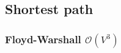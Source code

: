 \documentclass{article}
\begin{document}
\subsection{Shortest path}

\begin{comment}
\subsubsection{BFS $\mathcal{O}(V + E)$}

\begin{lstlisting}
int n, dist[MAXN];
vector<int> edges[MAXN]; // (to, cost)

// faster than dijkstra when all edge costs are the same
int bfs(int from, int to) {
	fill_n(dist, n, -1);
	dist[from] = 0;

	queue<int> q;
	q.push(from);
	while (!q.empty()) {
		int cur = q.front();
		q.pop();
		for (int nxt : edges[cur]) {
			if (dist[nxt] >= 0) {
				dist[nxt] = dist[cur] + 1;
				if (nxt == to) return dist[nxt];
				q.push(nxt);
			}
		}
	}
	return -1;
}
\end{lstlisting}
\end{comment}

\begin{comment}
\subsubsection{Dijkstra $\mathcal{O}(E + V \log V)$}

\begin{lstlisting}
int n, dist[MAXN];
bool vis[MAXN];
vector<pii> edges[MAXN]; // (to, cost)

void dijkstra() {
	fill_n(vis, n, false);
	priority_queue<pii, vector<pii>, greater<pii> > q; // (dist, vertex)
	q.push(pii(0, 0));

	while (!q.empty()) {
		pii v = q.top();
		q.pop();

		if (vis[v.y]) continue;
		vis[v.y] = true;

		for (const pii e : edges[v.y]) {
			q.push(pii(v.x + e.y, e.x));
		}
		dist[v.y] = v.x;
	}
}
\end{lstlisting}
\end{comment}

\subsubsection{Floyd-Warshall $\mathcal{O}(V^{3})$}
\end{document}
